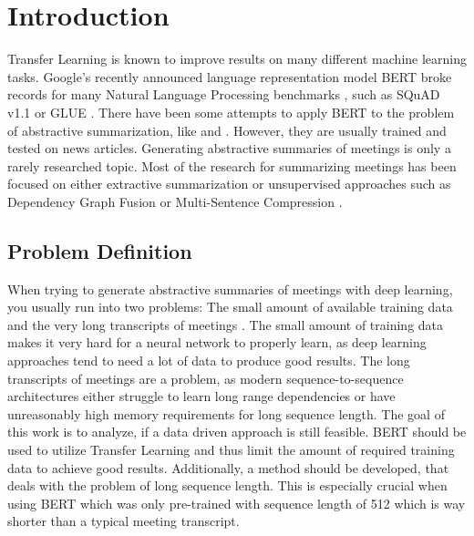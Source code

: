 \chapter{Introduction}\label{ch:Introduction}


Transfer Learning is known to improve results on many different machine learning tasks.
Google's recently announced language representation model BERT broke records for many Natural Language Processing benchmarks \cite[p.~5--7]{devlin2018bert}, such as  SQuAD v1.1 \cite{rajpurkar-etal-2016-squad} or GLUE \cite{1804.07461}.
There have been some attempts to apply BERT to the problem of abstractive summarization, like \cite{1902.09243} and \cite{1908.08345}.
However, they are usually trained and tested on news articles.
Generating abstractive summaries of meetings is only a rarely researched topic.
Most of the research for summarizing meetings has been focused on either extractive summarization or unsupervised approaches such as Dependency Graph Fusion \cite{1609.07035} or Multi-Sentence Compression \cite{shang-etal-2018-unsupervised}.


\section{Problem Definition}

When trying to generate abstractive summaries of meetings with deep learning, you usually run into two problems: The small amount of available training data and the very long transcripts of meetings \cite[p.~650--651]{10.1007/978-3-030-20521-8_53}.
The small amount of training data makes it very hard for a neural network to properly learn, as deep learning approaches tend to need a lot of data to produce good results.
The long transcripts of meetings are a problem, as modern sequence-to-sequence architectures either struggle to learn long range dependencies \cite{Hochreiter01gradientflow} or have unreasonably high memory requirements for long sequence length.
The goal of this work is to analyze, if a data driven approach is still feasible.
BERT should be used to utilize Transfer Learning and thus limit the amount of required training data to achieve good results.
Additionally, a method should be developed, that deals with the problem of long sequence length.
This is especially crucial when using BERT which was only pre-trained with sequence length of 512 \cite[p.~13]{devlin2018bert} which is way shorter than a typical meeting transcript.

